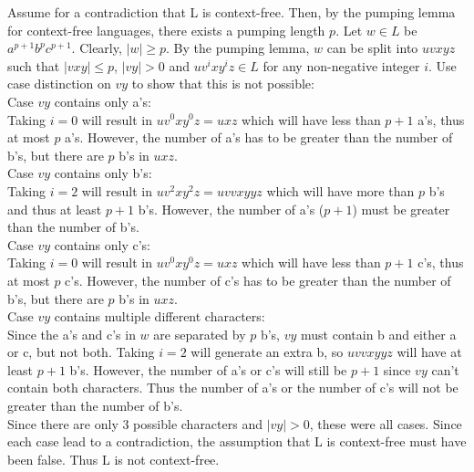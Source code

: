 \documentclass{article}
\begin{document}
Assume for a contradiction that L is context-free. 
Then, by the pumping lemma for context-free languages, there exists a pumping length $p$. 
Let $w \in L$ be $a^{p+1}b^pc^{p+1}$. Clearly, $|w| \geq p$.
By the pumping lemma, $w$ can be split into $uvxyz$ such that $|vxy| \leq p$, $|vy| > 0$ and  $uv^ixy^iz \in L$ for any non-negative integer $i$.
Use case distinction on $vy$ to show that this is not possible:\\
Case $vy$ contains only a's:\\
Taking $i = 0$ will result in $uv^0xy^0z = uxz$ which will have less than $p + 1$ a's, thus at most $p$ a's.
However, the number of a's has to be greater than the number of b's, but there are $p$ b's in $uxz$.\\
Case $vy$ contains only b's:\\
Taking $i = 2$ will result in $uv^2xy^2z = uvvxyyz$ which will have more than $p$ b's and thus at least $p + 1$ b's.
However, the number of a's ($p + 1$) must be greater than the number of b's.\\
Case $vy$ contains only c's:\\
Taking $i = 0$ will result in $uv^0xy^0z = uxz$ which will have less than $p + 1$ c's, thus at most $p$ c's.
However, the number of c's has to be greater than the number of b's, but there are $p$ b's in $uxz$.\\
Case $vy$ contains multiple different characters:\\
Since the a's and c's in $w$ are separated by $p$ b's, $vy$ must contain b and either a or c, but not both.
Taking $i = 2$ will generate an extra b, so $uvvxyyz$ will have at least $p + 1$ b's.
However, the number of a's or c's will still be $p + 1$ since $vy$ can't contain both characters.
Thus the number of a's or the number of c's will not be greater than the number of b's.\\
Since there are only 3 possible characters and $|vy| > 0$, these were all cases.
Since each case lead to a contradiction, the assumption that L is context-free must have been false.
Thus L is not context-free.
\end{document}
